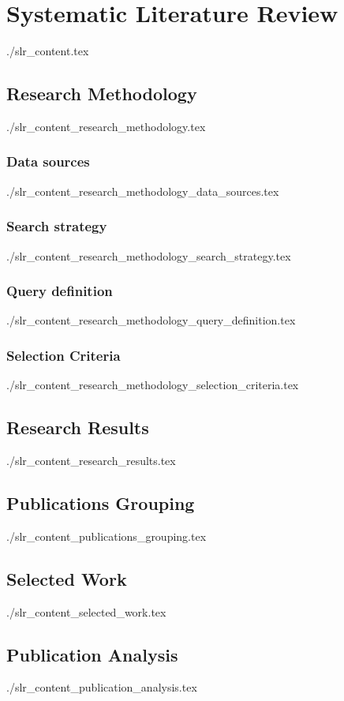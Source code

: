 \section{Systematic Literature Review}
  {./slr_content.tex}

\subsection{Research Methodology} \label{sub:research-methodology}
  {./slr_content_research_methodology.tex}
  \subsubsection{Data sources}
  {./slr_content_research_methodology_data_sources.tex}
  \subsubsection{Search strategy}
  {./slr_content_research_methodology_search_strategy.tex}
  \subsubsection{Query definition}
  {./slr_content_research_methodology_query_definition.tex}
  \subsubsection{Selection Criteria} \label{sub:selection-criteria}
  {./slr_content_research_methodology_selection_criteria.tex}

\subsection{Research Results}
  {./slr_content_research_results.tex}

\subsection{Publications Grouping}
  {./slr_content_publications_grouping.tex}

\subsection{Selected Work}
  {./slr_content_selected_work.tex}

\subsection{Publication Analysis} \label{sub:publication-analysis}
  {./slr_content_publication_analysis.tex}
